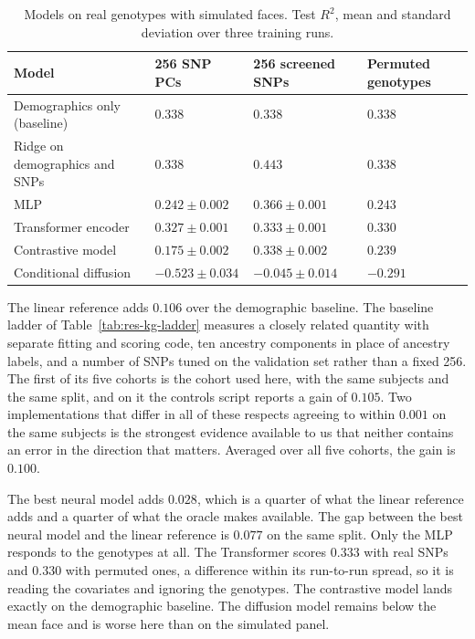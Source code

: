 \begin{table}[!ht]
\centering
\caption{Models on real genotypes with simulated faces. Test $R^2$, mean and standard deviation over three training runs.}
\label{tab:res-kg-models}
\small
\begin{tabular}{|P{5.4cm}|P{3.4cm}|P{3.0cm}|P{2.2cm}|}
\hline
\textbf{Model} & \textbf{256 SNP PCs} & \textbf{256 screened SNPs} & \textbf{Permuted genotypes} \\ \hline
Demographics only (baseline) & $0.338$ & $0.338$ & $0.338$ \\ \hline
Ridge on demographics and SNPs & $0.338$ & $0.443$ & $0.338$ \\ \hline
MLP & $0.242 \pm 0.002$ & $0.366 \pm 0.001$ & $0.243$ \\ \hline
Transformer encoder & $0.327 \pm 0.001$ & $0.333 \pm 0.001$ & $0.330$ \\ \hline
Contrastive model & $0.175 \pm 0.002$ & $0.338 \pm 0.002$ & $0.239$ \\ \hline
Conditional diffusion & $-0.523 \pm 0.034$ & $-0.045 \pm 0.014$ & $-0.291$ \\ \hline
\end{tabular}
\end{table}

The linear reference adds $0.106$ over the demographic baseline. The baseline ladder of Table~\ref{tab:res-kg-ladder} measures a closely related quantity with separate fitting and scoring code, ten ancestry components in place of ancestry labels, and a number of SNPs tuned on the validation set rather than a fixed 256. The first of its five cohorts is the cohort used here, with the same subjects and the same split, and on it the controls script reports a gain of $0.105$. Two implementations that differ in all of these respects agreeing to within $0.001$ on the same subjects is the strongest evidence available to us that neither contains an error in the direction that matters. Averaged over all five cohorts, the gain is $0.100$.

The best neural model adds $0.028$, which is a quarter of what the linear reference adds and a quarter of what the oracle makes available. The gap between the best neural model and the linear reference is $0.077$ on the same split. Only the MLP responds to the genotypes at all. The Transformer scores $0.333$ with real SNPs and $0.330$ with permuted ones, a difference within its run-to-run spread, so it is reading the covariates and ignoring the genotypes. The contrastive model lands exactly on the demographic baseline. The diffusion model remains below the mean face and is worse here than on the simulated panel.


